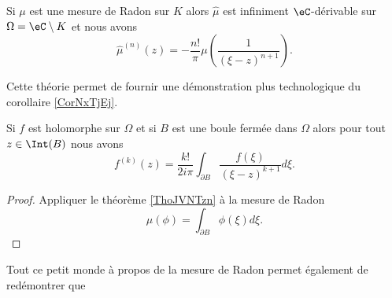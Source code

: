 \begin{theorem}     \label{ThoJVNTzn}
    Si \( \mu\) est une mesure de Radon sur \( K\) alors \( \hat \mu\) est infiniment \( \eC\)-dérivable sur \( \Omega=\eC\setminus K\) et nous avons
    \begin{equation}
        \hat\mu^{(n)}(z)=-\frac{ n! }{ \pi }\mu\left( \frac{1}{ (\xi-z)^{n+1} } \right).
    \end{equation}
\end{theorem}

Cette théorie permet de fournir une démonstration plus technologique du corollaire \ref{CorNxTjEj}.
\begin{lemma}
    Si \( f\) est holomorphe sur \( \Omega\) et si \( B\) est une boule fermée dans \( \Omega\) alors pour tout \( z\in \Int(B)\) nous avons
    \begin{equation}
        f^{(k)}(z)=\frac{ k! }{ 2i\pi }\int_{\partial B}\frac{ f(\xi) }{ (\xi-z)^{k+1} }d\xi.
    \end{equation}
\end{lemma}

\begin{proof}
    Appliquer le théorème \ref{ThoJVNTzn} à la mesure de Radon
    \begin{equation}
        \mu(\phi)=\int_{\partial B}\phi(\xi)d\xi.
    \end{equation}
\end{proof}

Tout ce petit monde à propos de la mesure de Radon permet également de redémontrer que

